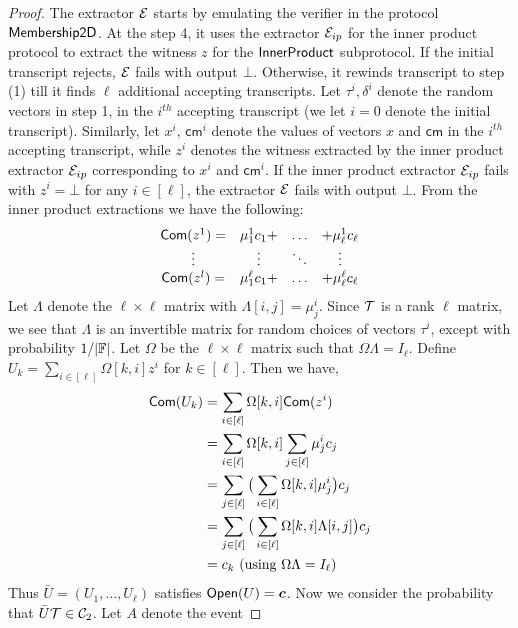\begin{proof}
The extractor $\mathcal{E}$ starts by emulating the verifier in the protocol
$\mathsf{Membership2D}$. At the step 4, it uses the extractor $\mathcal{E}_{ip}$ for the
inner product protocol to extract the witness $z$ for the $\mathsf{InnerProduct}$
subprotocol. If the initial transcript rejects, $\mathcal{E}$ fails with output
$\bot$. Otherwise, it rewinds transcript to step (1) till it finds $\ell$
additional accepting transcripts. Let $\tau^i,\delta^i$ denote the random
vectors in step 1, in the $i^{th}$ accepting transcript (we let $i=0$ denote the
initial transcript). Similarly, let $x^i$, $\mathsf{cm}^i$ denote the values of
vectors $x$ and $\mathsf{cm}$ in the $i^{th}$ accepting transcript, while $z^i$
denotes the witness extracted by the inner product extractor $\mathcal{E}_{ip}$
corresponding to $x^i$ and $\mathsf{cm}^i$. If the inner product extractor
$\mathcal{E}_{ip}$ fails with $z^i=\bot$ for any $i\in [\ell]$, the extractor $\mathcal{E}$
fails with output $\bot$. From the inner product extractions we have the
following:
\begin{align*}
\begin{array}{cccc}
\mathsf{Com}(z^1)=&  \mu^1_1c_1+ & \hdots & +\mu^1_{\ell}c_{\ell} \\
\vdots & \vdots & \ddots & \vdots \\
\mathsf{Com}(z^l)=& \mu^{\ell}_1c_1+ & \hdots & +\mu^{\ell}_{\ell}c_{\ell} 
\end{array}
\end{align*}
Let $\Lambda$ denote the $\ell\times \ell$ matrix with $\Lambda[i,j]=\mu^i_j$.
Since $\mathcal{T}$ is a rank $\ell$ matrix, we see that $\Lambda$ is an invertible
matrix for random choices of vectors $\tau^i$, except with probability
$1/|\mathbb{F}|$. Let $\Omega$ be the $\ell\times \ell$ matrix such that
$\Omega\Lambda=I_{\ell}$. Define $U_k = \sum_{i\in [\ell]}\Omega[k,i]z^i$ for
$k\in [\ell]$. Then we have,
\begin{align*}
\mathsf{Com}(U_k) &= \sum_{i\in [\ell]}\Omega[k,i]\mathsf{Com}(z^i)  \\
	&= \sum_{i\in [\ell]}\Omega[k,i]\sum_{j\in [\ell]}\mu^i_jc_j \\
	&= \sum_{j\in [\ell]}\big(\sum_{i\in [\ell]}\Omega[k,i]\mu^i_j\big)c_j \\
	&= \sum_{j\in [\ell]}\big(\sum_{i\in [\ell]}\Omega[k,i]\Lambda[i,j]\big)c_j
\\
	&= c_k \text{ (using $\Omega\Lambda=I_{\ell})$ }
\end{align*}
Thus $\bar{U}=(U_1,\ldots,U_{\ell})$ satisfies $\mathsf{Open}(U)=\bm{c}$. Now we
consider the probability that $\bar{U}\mathcal{T}\in \mathcal{C}_2$. Let $A$ denote the event

\end{proof}

